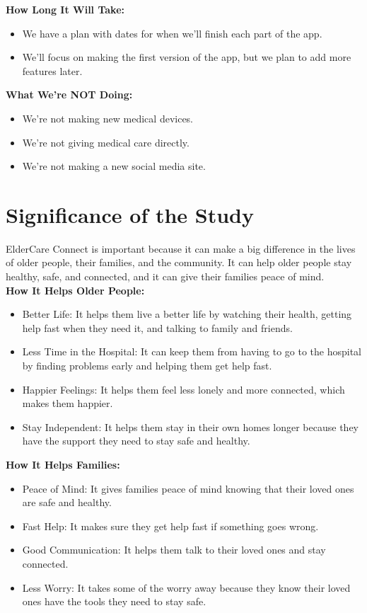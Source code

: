 \textbf{How Long It Will Take:}
\begin{itemize}
    \item We have a plan with dates for when we'll finish each part of the app.
    \item We'll focus on making the first version of the app, but we plan to add more features later.
\end{itemize}
\textbf{What We're NOT Doing:}
\begin{itemize}
    \item We're not making new medical devices.
    \item We're not giving medical care directly.
    \item We're not making a new social media site.
\end{itemize}
\section{Significance of the Study}
ElderCare Connect is important because it can make a big difference in the lives of older people, their families, and the community. It can help older people stay healthy, safe, and connected, and it can give their families peace of mind.\\
\textbf{How It Helps Older People:}
\begin{itemize}
    \item Better Life: It helps them live a better life by watching their health, getting help fast when they need it, and talking to family and friends.
    \item Less Time in the Hospital: It can keep them from having to go to the hospital by finding problems early and helping them get help fast.
    \item Happier Feelings: It helps them feel less lonely and more connected, which makes them happier.
    \item Stay Independent: It helps them stay in their own homes longer because they have the support they need to stay safe and healthy.
\end{itemize}
\textbf{How It Helps Families:}
\begin{itemize}
    \item Peace of Mind: It gives families peace of mind knowing that their loved ones are safe and healthy.
    \item Fast Help: It makes sure they get help fast if something goes wrong.
    \item Good Communication: It helps them talk to their loved ones and stay connected.
    \item Less Worry: It takes some of the worry away because they know their loved ones have the tools they need to stay safe.
\end{itemize}
